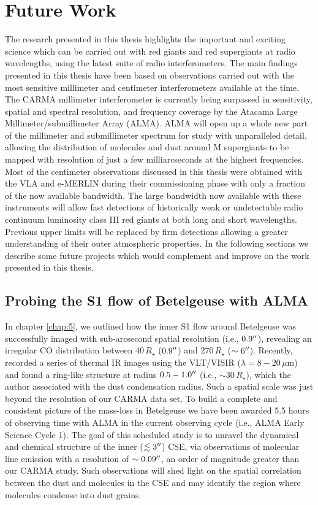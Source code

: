 \section{Future Work}\label{sec:8.2}
The research presented in this thesis highlights the important and exciting science which can be carried out with red giants and red supergiants at radio wavelengths, using the latest suite of radio interferometers. The main findings presented in this thesis have been based on observations carried out with the most sensitive millimeter and centimeter interferometers available at the time. The CARMA millimeter interferometer is currently being surpassed in sensitivity, spatial and spectral resolution, and frequency coverage by the Atacama Large Millimeter/submillimeter Array (ALMA). ALMA will open up a whole new part of the millimeter and submillimeter spectrum for study with  unparalleled detail, allowing the distribution of molecules and dust around M supergiants to be mapped with resolution of just a few milliarcseconds at the highest frequencies. Most of the centimeter observations discussed in this thesis were obtained with the VLA and e-MERLIN during their commissioning phase with only a fraction of the now available bandwidth. The large bandwidth now available with these instruments will  allow fast detections of historically weak or undetectable radio continuum luminosity class III red giants at both long and short wavelengths. Previous upper limits will be replaced by firm detections allowing a greater understanding of their outer atmospheric properties. In the following sections we describe some future projects which would complement and improve on the work presented in this thesis.

\subsection{Probing the S1 flow of Betelgeuse with ALMA}\label{sec:8.2.1}
In chapter \ref{chap:5}, we outlined how the inner S1 flow around Betelgeuse was successfully imaged with sub-arcsecond spatial resolution (i.e., $0.9^{\prime\prime}$), revealing an irregular CO distribution between $40\,R_{\star}$ ($0.9^{\prime\prime}$) and $270\,R_{\star}$ ($\sim 6^{\prime\prime}$). Recently, \cite{kervella_2011} recorded a series of thermal IR images using the VLT/VISIR ($\lambda = 8-20\,\mu$m) and found a ring-like structure at radius $0.5-1.0^{\prime\prime}$ (i.e., $\sim 30\,R_{\star}$), which the author associated with the dust condensation radius. Such a spatial scale was just beyond the resolution of our CARMA data set. To build a complete and consistent picture of the mass-loss in Betelgeuse we have been awarded 5.5 hours of observing time with ALMA in the current observing cycle (i.e., ALMA Early Science Cycle 1). The goal of this scheduled study is to unravel the dynamical and chemical structure of the inner ($\lesssim 3^{\prime\prime}$) CSE, via observations of molecular line emission with a resolution of $\sim 0.09^{\prime\prime}$, an order of magnitude greater than our CARMA study. Such observations will shed light on the spatial correlation between the dust and molecules in the CSE and may identify the region where molecules condense into dust grains.

